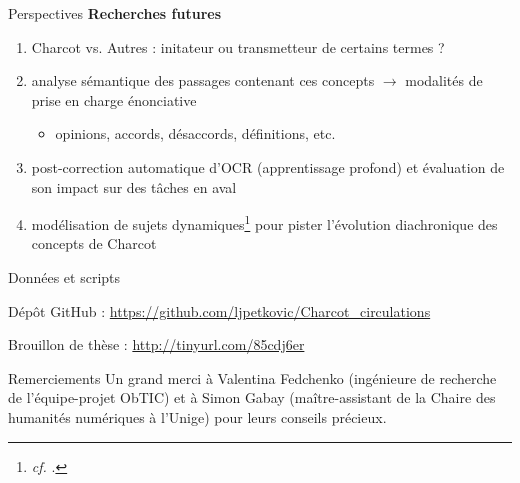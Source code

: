 \begin{frame}{Perspectives}
\textbf{Recherches futures}
    \begin{enumerate}
        \item Charcot vs. Autres : initateur ou transmetteur de certains termes ?
        \item analyse sémantique des passages contenant ces concepts $\rightarrow{}$ modalités de prise en charge énonciative
        \begin{itemize}
            \item opinions,
accords, désaccords, définitions, etc.
        \end{itemize}
        \item post-correction automatique d'OCR (apprentissage profond) et évaluation de son impact sur des tâches en aval
        \item modélisation de sujets dynamiques\footnote{\textit{cf.} \cite{blei2006}.} pour pister l'évolution diachronique des concepts de Charcot
    \end{enumerate}
\end{frame}

\begin{frame}{Données et scripts}
\begin{itemize}
{\footnotesize\item Dépôt GitHub : \url{https://github.com/ljpetkovic/Charcot_circulations}}
{\footnotesize\item Brouillon de thèse : \url{http://tinyurl.com/85cdj6er}}
\end{itemize}

\end{frame}

\begin{frame}{Remerciements}
Un grand merci à Valentina Fedchenko (ingénieure de recherche de l'équipe-projet ObTIC) et à Simon Gabay (maître-assistant de la Chaire des humanités numériques à l'Unige) pour leurs conseils précieux.
\end{frame}